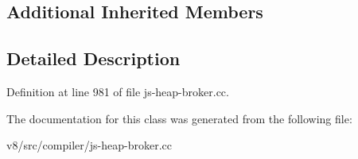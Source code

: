 \subsection*{Additional Inherited Members}


\subsection{Detailed Description}


Definition at line 981 of file js-\/heap-\/broker.\+cc.



The documentation for this class was generated from the following file\+:\begin{DoxyCompactItemize}
\item 
v8/src/compiler/js-\/heap-\/broker.\+cc\end{DoxyCompactItemize}

